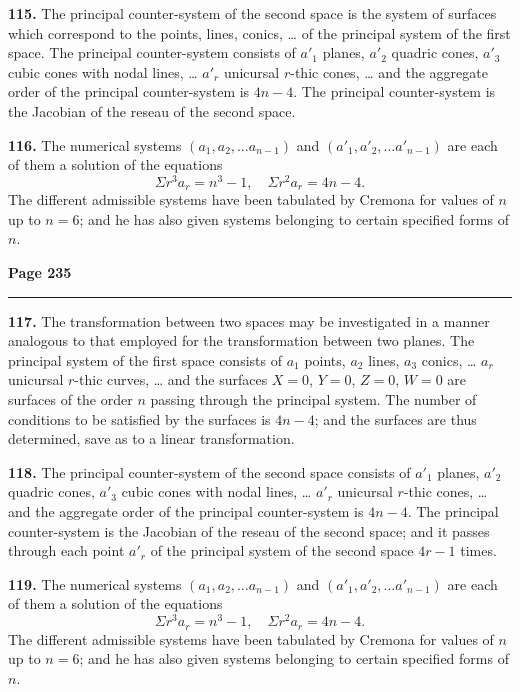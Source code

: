 \documentclass[12pt,a4paper]{article}
\theoremstyle{plain}
\theoremstyle{definition}
\theoremstyle{remark}
\begin{document}
\textbf{115.} The principal counter-system of the second space is the system of surfaces which correspond to the points, lines, conics, \ldots{} of the principal system of the first space. The principal counter-system consists of $a'_1$ planes, $a'_2$ quadric cones, $a'_3$ cubic cones with nodal lines, \ldots{} $a'_r$ unicursal $r$-thic cones, \ldots{} and the aggregate order of the principal counter-system is $4n - 4$. The principal counter-system is the Jacobian of the reseau of the second space.

\textbf{116.} The numerical systems $(a_1, a_2, \ldots a_{n-1})$ and $(a'_1, a'_2, \ldots a'_{n-1})$ are each of them a solution of the equations
\[
\Sigma r^3 a_r = n^3 - 1, \quad \Sigma r^2 a_r = 4n - 4.
\]
The different admissible systems have been tabulated by Cremona for values of $n$ up to $n = 6$; and he has also given systems belonging to certain specified forms of $n$.

\newpage
\noindent\textbf{Page 235}\\
\noindent\rule{\textwidth}{0.4pt}

\smallskip

\noindent\textbf{117.} The transformation between two spaces may be investigated in a manner analogous to that employed for the transformation between two planes. The principal system of the first space consists of $a_1$ points, $a_2$ lines, $a_3$ conics, \ldots{} $a_r$ unicursal $r$-thic curves, \ldots{} and the surfaces $X = 0$, $Y = 0$, $Z = 0$, $W = 0$ are surfaces of the order $n$ passing through the principal system. The number of conditions to be satisfied by the surfaces is $4n - 4$; and the surfaces are thus determined, save as to a linear transformation.

\textbf{118.} The principal counter-system of the second space consists of $a'_1$ planes, $a'_2$ quadric cones, $a'_3$ cubic cones with nodal lines, \ldots{} $a'_r$ unicursal $r$-thic cones, \ldots{} and the aggregate order of the principal counter-system is $4n - 4$. The principal counter-system is the Jacobian of the reseau of the second space; and it passes through each point $a'_r$ of the principal system of the second space $4r - 1$ times.

\textbf{119.} The numerical systems $(a_1, a_2, \ldots a_{n-1})$ and $(a'_1, a'_2, \ldots a'_{n-1})$ are each of them a solution of the equations
\[
\Sigma r^3 a_r = n^3 - 1, \quad \Sigma r^2 a_r = 4n - 4.
\]
The different admissible systems have been tabulated by Cremona for values of $n$ up to $n = 6$; and he has also given systems belonging to certain specified forms of $n$.
\end{document}
